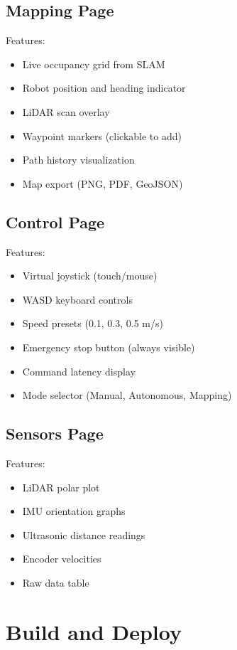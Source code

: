 \documentclass[11pt,letterpaper]{article}
\begin{document}
\subsection{Mapping Page}

Features:
\begin{itemize}
    \item Live occupancy grid from SLAM
    \item Robot position and heading indicator
    \item LiDAR scan overlay
    \item Waypoint markers (clickable to add)
    \item Path history visualization
    \item Map export (PNG, PDF, GeoJSON)
\end{itemize}

\subsection{Control Page}

Features:
\begin{itemize}
    \item Virtual joystick (touch/mouse)
    \item WASD keyboard controls
    \item Speed presets (0.1, 0.3, 0.5 m/s)
    \item Emergency stop button (always visible)
    \item Command latency display
    \item Mode selector (Manual, Autonomous, Mapping)
\end{itemize}

\subsection{Sensors Page}

Features:
\begin{itemize}
    \item LiDAR polar plot
    \item IMU orientation graphs
    \item Ultrasonic distance readings
    \item Encoder velocities
    \item Raw data table
\end{itemize}

\section{Build and Deploy}
\end{document}
